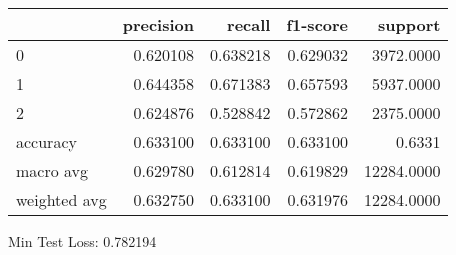 \begin{tabular}{lrrrr}
\toprule
{} &  precision &    recall &  f1-score &     support \\
\midrule
0            &   0.620108 &  0.638218 &  0.629032 &   3972.0000 \\
1            &   0.644358 &  0.671383 &  0.657593 &   5937.0000 \\
2            &   0.624876 &  0.528842 &  0.572862 &   2375.0000 \\
accuracy     &   0.633100 &  0.633100 &  0.633100 &      0.6331 \\
macro avg    &   0.629780 &  0.612814 &  0.619829 &  12284.0000 \\
weighted avg &   0.632750 &  0.633100 &  0.631976 &  12284.0000 \\
\bottomrule
\end{tabular}

Min Test Loss: 0.782194